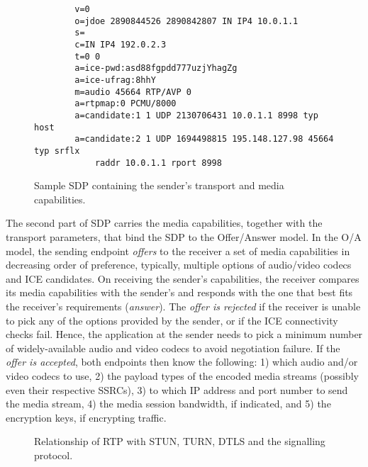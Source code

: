 
\begin{figure}[!h]
{\small
\begin{verbatim}
        v=0
        o=jdoe 2890844526 2890842807 IN IP4 10.0.1.1
        s=
        c=IN IP4 192.0.2.3
        t=0 0
        a=ice-pwd:asd88fgpdd777uzjYhagZg
        a=ice-ufrag:8hhY
        m=audio 45664 RTP/AVP 0
        a=rtpmap:0 PCMU/8000
        a=candidate:1 1 UDP 2130706431 10.0.1.1 8998 typ host
        a=candidate:2 1 UDP 1694498815 195.148.127.98 45664 typ srflx
            raddr 10.0.1.1 rport 8998
\end{verbatim}
}
\caption{Sample SDP containing the sender's transport and media capabilities.}
\label{fig:3:sdp}
\end{figure}

The second part of SDP carries the media capabilities, together with the
transport parameters, that bind the SDP to the Offer/Answer model. In the O/A
model, the sending endpoint \emph{offers} to the receiver a set of media
capabilities in decreasing order of preference, typically, multiple options of
audio/video codecs and ICE candidates. On receiving the sender's capabilities,
the receiver compares its media capabilities with the sender's and responds
with the one that best fits the receiver's requirements (\emph{answer}). The
\emph{offer is rejected} if the receiver is unable to pick any
of the options provided by the sender, or if the ICE connectivity checks fail.
Hence, the application at the sender needs to pick a minimum number of widely-available
audio and video codecs to avoid negotiation failure. If the
\emph{offer is accepted}, both endpoints then know the following: 1) which
audio and/or video codecs to use, 2) the payload types of the encoded media
streams (possibly even their respective SSRCs), 3) to which IP address and
port number to send the media stream, 4) the media session bandwidth, if
indicated, and 5) the encryption keys, if encrypting traffic.

\begin{figure}[!t]
\caption{Relationship of RTP with STUN, TURN, DTLS and the signalling protocol.}
\label{fig:3:rtp-stack}
\end{figure}

